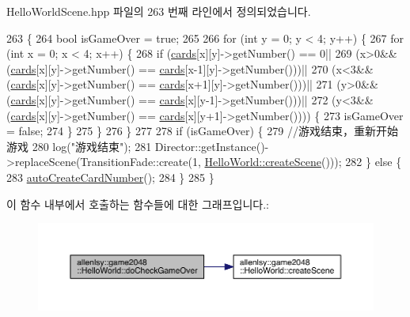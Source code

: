 Hello\+World\+Scene.\+hpp 파일의 263 번째 라인에서 정의되었습니다.


\begin{DoxyCode}
263                           \{
264         \textcolor{keywordtype}{bool} isGameOver = \textcolor{keyword}{true};
265         
266         \textcolor{keywordflow}{for} (\textcolor{keywordtype}{int} y = 0; y < 4; y++) \{
267             \textcolor{keywordflow}{for} (\textcolor{keywordtype}{int} x = 0; x < 4; x++) \{
268                 \textcolor{keywordflow}{if} (\hyperlink{classallenlsy_1_1game2048_1_1_hello_world_a1208d2de4b949d0b0f370b26f09fdf74}{cards}[x][y]->getNumber() == 0||
269                     (x>0&&(\hyperlink{classallenlsy_1_1game2048_1_1_hello_world_a1208d2de4b949d0b0f370b26f09fdf74}{cards}[x][y]->getNumber() == \hyperlink{classallenlsy_1_1game2048_1_1_hello_world_a1208d2de4b949d0b0f370b26f09fdf74}{cards}[x-1][y]->getNumber()))||
270                     (x<3&&(\hyperlink{classallenlsy_1_1game2048_1_1_hello_world_a1208d2de4b949d0b0f370b26f09fdf74}{cards}[x][y]->getNumber() == \hyperlink{classallenlsy_1_1game2048_1_1_hello_world_a1208d2de4b949d0b0f370b26f09fdf74}{cards}[x+1][y]->getNumber()))||
271                     (y>0&&(\hyperlink{classallenlsy_1_1game2048_1_1_hello_world_a1208d2de4b949d0b0f370b26f09fdf74}{cards}[x][y]->getNumber() == \hyperlink{classallenlsy_1_1game2048_1_1_hello_world_a1208d2de4b949d0b0f370b26f09fdf74}{cards}[x][y-1]->getNumber()))||
272                     (y<3&&(\hyperlink{classallenlsy_1_1game2048_1_1_hello_world_a1208d2de4b949d0b0f370b26f09fdf74}{cards}[x][y]->getNumber() == \hyperlink{classallenlsy_1_1game2048_1_1_hello_world_a1208d2de4b949d0b0f370b26f09fdf74}{cards}[x][y+1]->getNumber()))) \{
273                     isGameOver = \textcolor{keyword}{false};
274                 \}
275             \}
276         \}
277         
278         \textcolor{keywordflow}{if} (isGameOver) \{
279             \textcolor{comment}{//游戏结束，重新开始游戏}
280             log(\textcolor{stringliteral}{"游戏结束"});
281             Director::getInstance()->replaceScene(TransitionFade::create(1, 
      \hyperlink{classallenlsy_1_1game2048_1_1_hello_world_a86ca8a563151e5e5d308f98ff6c36f95}{HelloWorld::createScene}()));
282         \} \textcolor{keywordflow}{else} \{
283             \hyperlink{classallenlsy_1_1game2048_1_1_hello_world_af1c795b6d174c1d6d6472e0fe703e648}{autoCreateCardNumber}();
284         \}
285     \}
\end{DoxyCode}
이 함수 내부에서 호출하는 함수들에 대한 그래프입니다.\+:
\nopagebreak
\begin{figure}[H]
\begin{center}
\leavevmode
\includegraphics[width=350pt]{d5/d2b/classallenlsy_1_1game2048_1_1_hello_world_a4f9c99959e2c14cd349470d305909fca_cgraph}
\end{center}
\end{figure}
